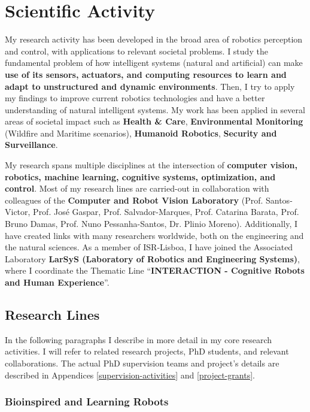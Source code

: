 \section{Scientific Activity}\label{scientific-activity}

My research activity has been developed in the broad area of robotics
perception and control, with applications to relevant societal problems.
I study the fundamental problem of how intelligent systems (natural and
artificial) can make \textbf{use of its sensors, actuators, and
computing resources to learn and adapt to unstructured and dynamic
environments}. Then, I try to apply my findings to improve current
robotics technologies and have a better understanding of natural
intelligent systems. My work has been applied in several areas of
societal impact such as \textbf{Health \& Care}, \textbf{Environmental
Monitoring} (Wildfire and Maritime scenarios), \textbf{Humanoid
Robotics}, \textbf{Security and Surveillance}.

My research spans multiple disciplines at the intersection of
\textbf{computer vision, robotics, machine learning, cognitive systems,
optimization, and control}. Most of my research lines are carried-out in
collaboration with colleagues of the \textbf{Computer and Robot Vision
Laboratory} (Prof. Santos-Victor, Prof. José Gaspar, Prof.
Salvador-Marques, Prof. Catarina Barata, Prof. Bruno Damas, Prof. Nuno
Pessanha-Santos, Dr. Plinio Moreno). Additionally, I have created links
with many researchers worldwide, both on the engineering and the natural
sciences. As a member of ISR-Lisboa, I have joined the Associated
Laboratory \textbf{LarSyS (Laboratory of Robotics and Engineering
Systems)}, where I coordinate the Thematic Line ``\textbf{INTERACTION -
Cognitive Robots and Human Experience}''.

\subsection{Research Lines}\label{research-lines}

In the following paragraphs I describe in more detail in my core
research activities. I will refer to related research projects, PhD
students, and relevant collaborations. The actual PhD supervision teams
and project's details are described in Appendices \ref{supervision-activities} and \ref{project-grants}.

\subsubsection{Bioinspired and Learning
Robots}\label{bioinspired-and-learning-robots}


